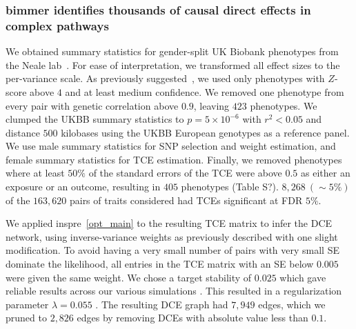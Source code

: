 \documentclass{article}
\begin{document}
\subsubsection*{bimmer identifies thousands of causal direct effects in complex pathways}
We obtained summary statistics for gender-split UK Biobank phenotypes from
the Neale lab~\cite{NealeUKBB}. For ease of interpretation,
we transformed all effect sizes to the per-variance scale. As previously suggested~\cite{BulikSullivan2015,NealeUKBB},
we used only phenotypes with $Z$-score above $4$ and at least medium confidence. We removed one phenotype from every pair with genetic
correlation above $0.9$, leaving $423$ phenotypes. We clumped the UKBB
summary statistics to $p=5 \times 10^{-6}$ with $r^2 < 0.05$ and distance $500$ kilobases using
the UKBB European genotypes as a reference panel. We use male summary statistics for SNP selection
and weight estimation, and female summary statistics for TCE estimation. Finally, we removed
phenotypes where at least $50\%$ of the standard errors of the TCE were above $0.5$
as either an exposure or an outcome, resulting in $405$ phenotypes (Table S?).
$8,268~(\sim 5\%)$ of the $163,620$ pairs of traits considered had TCEs significant at FDR $5\%$.

We applied inspre~\eqref{opt_main} to the resulting TCE matrix to infer the DCE network, using inverse-variance weights
as previously described with one slight modification. To avoid having a very small
number of pairs with very small SE dominate the likelihood, all entries in the TCE matrix with
an SE  below $0.005$ were given the same weight.  We chose a target stability of $0.025$ which gave reliable results across our various simulations . This resulted in a regularization 
parameter $\lambda = 0.055$ . The resulting DCE graph had $7,949$ edges, which we pruned to $2,826$ edges by removing DCEs with absolute value less than $0.1$. 
\end{document}
